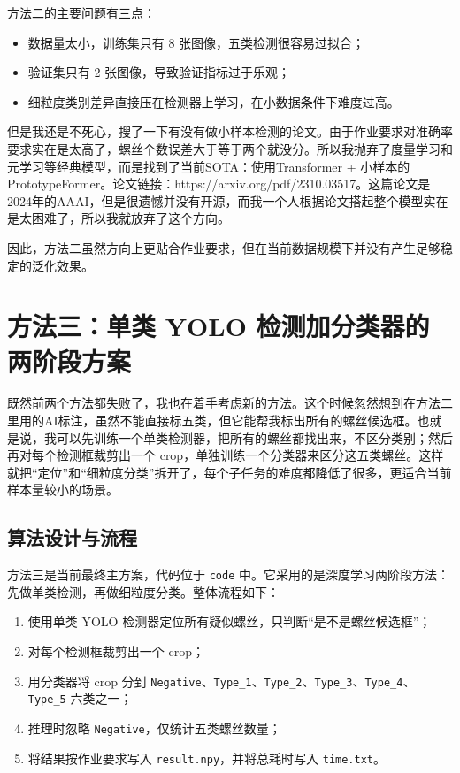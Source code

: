 \documentclass[12pt,a4paper]{ctexart}
\begin{document}
方法二的主要问题有三点：
\begin{itemize}
    \item 数据量太小，训练集只有 8 张图像，五类检测很容易过拟合；
    \item 验证集只有 2 张图像，导致验证指标过于乐观；
    \item 细粒度类别差异直接压在检测器上学习，在小数据条件下难度过高。
\end{itemize}

但是我还是不死心，搜了一下有没有做小样本检测的论文。由于作业要求对准确率要求实在是太高了，螺丝个数误差大于等于两个就没分。所以我抛弃了度量学习和元学习等经典模型，而是找到了当前SOTA：使用Transformer + 小样本的PrototypeFormer。论文链接：https://arxiv.org/pdf/2310.03517。这篇论文是2024年的AAAI，但是很遗憾并没有开源，而我一个人根据论文搭起整个模型实在是太困难了，所以我就放弃了这个方向。

因此，方法二虽然方向上更贴合作业要求，但在当前数据规模下并没有产生足够稳定的泛化效果。

\section{方法三：单类 YOLO 检测加分类器的两阶段方案}
既然前两个方法都失败了，我也在着手考虑新的方法。这个时候忽然想到在方法二里用的AI标注，虽然不能直接标五类，但它能帮我标出所有的螺丝候选框。也就是说，我可以先训练一个单类检测器，把所有的螺丝都找出来，不区分类别；然后再对每个检测框裁剪出一个 crop，单独训练一个分类器来区分这五类螺丝。这样就把“定位”和“细粒度分类”拆开了，每个子任务的难度都降低了很多，更适合当前样本量较小的场景。

\subsection{算法设计与流程}

方法三是当前最终主方案，代码位于 \texttt{code} 中。它采用的是深度学习两阶段方法：先做单类检测，再做细粒度分类。整体流程如下：
\begin{enumerate}
    \item 使用单类 YOLO 检测器定位所有疑似螺丝，只判断“是不是螺丝候选框”；
    \item 对每个检测框裁剪出一个 crop；
    \item 用分类器将 crop 分到 \texttt{Negative}、\texttt{Type\_1}、\texttt{Type\_2}、\texttt{Type\_3}、\texttt{Type\_4}、\texttt{Type\_5} 六类之一；
    \item 推理时忽略 \texttt{Negative}，仅统计五类螺丝数量；
    \item 将结果按作业要求写入 \texttt{result.npy}，并将总耗时写入 \texttt{time.txt}。
\end{enumerate}
\end{document}
